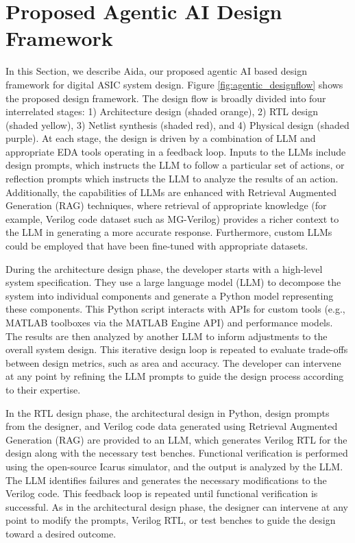 \section{Proposed Agentic AI Design Framework}
\label{sec:agentic}

In this Section, we describe Aida, our proposed agentic AI based design framework for digital ASIC system design. Figure \ref{fig:agentic_designflow} shows the proposed design  framework. The design flow is broadly divided into four interrelated stages: 1) Architecture design (shaded orange), 2) RTL design (shaded yellow), 3) Netlist synthesis (shaded red), and 4) Physical design (shaded purple). At each stage, the design is driven by a combination of LLM and appropriate EDA tools operating in a feedback loop. Inputs to the LLMs include design prompts, which instructs the LLM to follow a particular set of actions, or reflection prompts which instructs the LLM to analyze the results of an action. Additionally, the capabilities of LLMs are enhanced with Retrieval Augmented Generation (RAG) techniques, where retrieval of appropriate knowledge (for example, Verilog code dataset such as MG-Verilog) provides a richer context to the LLM in generating a more accurate response. Furthermore, custom LLMs could be employed that have been fine-tuned with appropriate datasets.


During the architecture design phase, the developer starts with a high-level system specification. They use a large language model (LLM) to decompose the system into individual components and generate a Python model representing these components. This Python script interacts with APIs for custom tools (e.g., MATLAB toolboxes via the MATLAB Engine API) and performance models. The results are then analyzed by another LLM to inform adjustments to the overall system design. This iterative design loop is repeated to evaluate trade-offs between design metrics, such as area and accuracy. The developer can intervene at any point by refining the LLM prompts to guide the design process according to their expertise.

In the RTL design phase, the architectural design in Python, design prompts from the designer, and Verilog code data generated using Retrieval Augmented Generation (RAG) are provided to an LLM, which generates Verilog RTL for the design along with the necessary test benches. Functional verification is performed using the open-source Icarus simulator, and the output is analyzed by the LLM. The LLM identifies failures and generates the necessary modifications to the Verilog code. This feedback loop is repeated until functional verification is successful. As in the architectural design phase, the designer can intervene at any point to modify the prompts, Verilog RTL, or test benches to guide the design toward a desired outcome.

